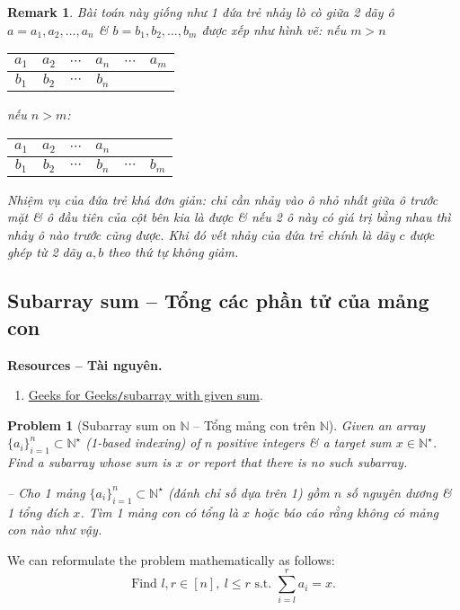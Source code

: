 \documentclass{article}
\newtheorem{problem}{Problem}
\newtheorem{remark}{Remark}
\begin{document}
\begin{remark}
    Bài toán này giống như 1 đứa trẻ nhảy lò cò giữa 2 dãy ô $a = a_1,a_2,\ldots,a_n$ \& $b = b_1,b_2,\ldots,b_m$ được xếp như hình vẽ: nếu $m > n$
    \begin{table}[H]
        \centering
        \begin{tabular}{|c|c|c|c|c|c|}
            \hline
            $a_1$ & $a_2$ & $\cdots$ & $a_n$ & $\cdots$ & $a_m$ \\
            \hline
            $b_1$ & $b_2$ & $\cdots$ & $b_n$ &  &  \\
            \hline
        \end{tabular}
    \end{table}
    nếu $n > m$:
    \begin{table}[H]
        \centering
        \begin{tabular}{|c|c|c|c|c|c|}
            \hline
            $a_1$ & $a_2$ & $\cdots$ & $a_n$ &  & \\
            \hline
            $b_1$ & $b_2$ & $\cdots$ & $b_n$ & $\cdots$ & $b_m$ \\
            \hline
        \end{tabular}
    \end{table}
    Nhiệm vụ của đứa trẻ khá đơn giản: chỉ cần nhảy vào ô nhỏ nhất giữa ô trước mặt \& ô đầu tiên của cột bên kia là được \& nếu 2 ô này có giá trị bằng nhau thì nhảy ô nào trước cũng được. Khi đó vết nhảy của đứa trẻ chính là dãy $c$ được ghép từ 2 dãy $a,b$ theo thứ tự không giảm.
\end{remark}


\subsection{Subarray sum -- Tổng các phần tử của mảng con}
\textbf{\textsf{Resources -- Tài nguyên.}}
\begin{enumerate}
    \item \href{https://www.geeksforgeeks.org/dsa/find-subarray-with-given-sum/}{Geeks for Geeks{\tt/}subarray with given sum}.
\end{enumerate}

\begin{problem}[Subarray sum on $\mathbb{N}$ -- Tổng mảng con trên $\mathbb{N}$]
    Given an array $\{a_i\}_{i=1}^n\subset\mathbb{N}^\star$ (1-based indexing) of $n$ positive integers \& a target sum $x\in\mathbb{N}^\star$. Find a subarray whose sum is $x$ or report that there is no such subarray.

    -- Cho 1 mảng $\{a_i\}_{i=1}^n\subset\mathbb{N}^\star$ (đánh chỉ số dựa trên 1) gồm $n$ số nguyên dương \& 1 tổng đích $x$. Tìm 1 mảng con có tổng là $x$ hoặc báo cáo rằng không có mảng con nào như vậy.
\end{problem}
We can reformulate the problem mathematically as follows:
\begin{equation*}
    \mbox{Find } l,r\in[n],\ l\le r\mbox{ s.t. }\sum_{i=l}^r a_i = x.
\end{equation*}
\end{document}
